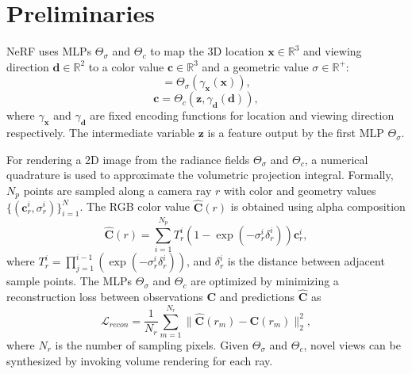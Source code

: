 \documentclass[10pt,twocolumn,letterpaper]{article}
\begin{document}
\section{Preliminaries}
\label{sec:preliminary}
NeRF \cite{nerf2020} uses MLPs $\Theta_{\sigma}$ and $\Theta_{c}$ to map the 3D location $\mathbf{x} \in \mathbb{R}^3$ and viewing direction $\mathbf{d} \in \mathbb{R}^2$ to a color value $\mathbf{c} \in \mathbb{R}^3$ and a geometric value $\sigma \in \mathbb{R}^+$:
\begin{equation}
[\sigma, \mathbf{z}]=\Theta_{\sigma}\left(\gamma_{\mathbf{x}}(\mathbf{x})\right),
\label{eq:sigma}
\end{equation}
\begin{equation}
\mathbf{c}=\Theta_{c}\left(\mathbf{z}, \gamma_{\mathbf{d}}(\mathbf{d})\right),
\label{eq:nerffirst}
\end{equation}
where $\gamma_{\mathbf{x}}$ and $\gamma_{\mathbf{d}}$ are fixed encoding functions for location and viewing direction respectively. The intermediate variable $\mathbf{z}$ is a feature output by the first MLP $\Theta_{\sigma}$.


%
%

For rendering a 2D image from the radiance fields $\Theta_{\sigma}$ and $\Theta_{c}$, a numerical quadrature is used to approximate the volumetric projection integral. Formally, $N_p$ points are sampled along a camera ray $r$ with color and geometry values $\{(\mathbf{c}_r^i, \sigma_r^i)\}_{i=1}^N$. The RGB color value $\hat{\mathbf{C}}(r)$ is obtained using alpha composition
\begin{equation}
  \hat{\mathbf{C}}(r)=\sum_{i=1}^{N_p} T_r^i (1-\exp \left(-\sigma_r^i \delta_r^i\right)) \mathbf{c}_r^i,
  \label{eq:integral}
\end{equation}
where $T_r^i=\prod_{j=1}^{i-1}\left(\exp \left(-\sigma_r^i \delta_r^i\right)\right)$, and 
$\delta_r^i$ is the distance between adjacent sample points. The MLPs $\Theta_{\sigma}$ and $\Theta_{c}$ are optimized by minimizing a reconstruction loss between observations $\mathbf{C}$ and predictions $\hat{\mathbf{C}}$ as
\begin{equation}
  \mathcal{L}_{recon} = \frac{1}{N_r}\sum_{m =1}^{N_r}\|\hat{\mathbf{C}}(r_m)-\mathbf{C}(r_m)\|_2^2,
  \label{eq:recon}
\end{equation}
where $N_r$ is the number of sampling pixels. Given $\Theta_{\sigma}$ and $\Theta_{c}$, novel views can be synthesized by invoking volume rendering for each ray.
\end{document}
